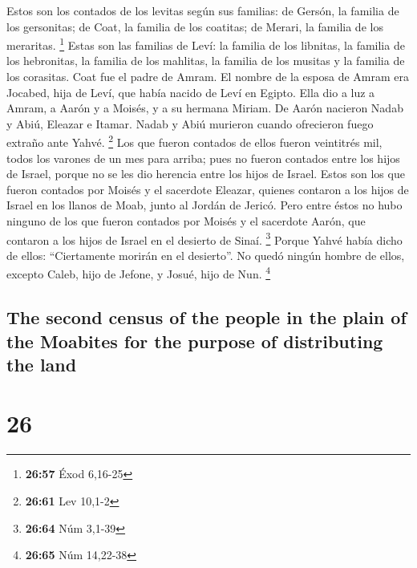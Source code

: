 \begin{paracol}{2}
 Estos son los contados de los levitas según sus
familias: de Gersón, la familia de los gersonitas; de Coat, la familia
de los coatitas; de Merari, la familia de los meraritas. \footnote{\textbf{26:57}
  Éxod 6,16-25}  Estas son las familias de Leví: la
familia de los libnitas, la familia de los hebronitas, la familia de los
mahlitas, la familia de los musitas y la familia de los corasitas. Coat
fue el padre de Amram.  El nombre de la esposa de Amram
era Jocabed, hija de Leví, que había nacido de Leví en Egipto. Ella dio
a luz a Amram, a Aarón y a Moisés, y a su hermana Miriam.
 De Aarón nacieron Nadab y Abiú, Eleazar e Itamar.
 Nadab y Abiú murieron cuando ofrecieron fuego extraño
ante Yahvé. \footnote{\textbf{26:61} Lev 10,1-2}  Los que
fueron contados de ellos fueron veintitrés mil, todos los varones de un
mes para arriba; pues no fueron contados entre los hijos de Israel,
porque no se les dio herencia entre los hijos de Israel. 
Estos son los que fueron contados por Moisés y el sacerdote Eleazar,
quienes contaron a los hijos de Israel en los llanos de Moab, junto al
Jordán de Jericó.  Pero entre éstos no hubo ninguno de
los que fueron contados por Moisés y el sacerdote Aarón, que contaron a
los hijos de Israel en el desierto de Sinaí. \footnote{\textbf{26:64}
  Núm 3,1-39}  Porque Yahvé había dicho de ellos:
``Ciertamente morirán en el desierto''. No quedó ningún hombre de ellos,
excepto Caleb, hijo de Jefone, y Josué, hijo de Nun. \footnote{\textbf{26:65}
  Núm 14,22-38}

\switchcolumn
\begin{otherlanguage}{english}

\hypertarget{the-second-census-of-the-people-in-the-plain-of-the-moabites-for-the-purpose-of-distributing-the-land}{%
\subsection{The second census of the people in the plain of the Moabites
for the purpose of distributing the
land}\label{the-second-census-of-the-people-in-the-plain-of-the-moabites-for-the-purpose-of-distributing-the-land}}

\hypertarget{section-51}{%
\section{26}\label{section-51}}


\end{otherlanguage}
\end{paracol}

